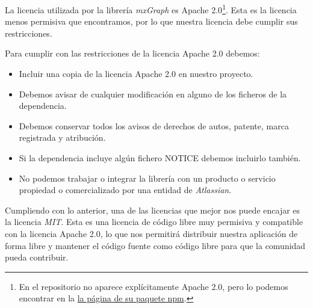 La licencia utilizada por la librería \textit{mxGraph} es Apache 2.0\footnote{En el repositorio no aparece explícitamente Apache 2.0, pero lo podemos encontrar en la \href{https://www.npmjs.com/package/mxgraph}{la página de su paquete npm}.}. Esta es la licencia menos permisiva que encontramos, por lo que nuestra licencia debe cumplir sus restricciones.

Para cumplir con las restricciones de la licencia Apache 2.0 debemos:
\begin{itemize}
    \item Incluir una copia de la licencia Apache 2.0 en nuestro proyecto.
    \item Debemos avisar de cualquier modificación en alguno de los ficheros de la dependencia.
    \item Debemos conservar todos los avisos de derechos de autos, patente, marca registrada y atribución.
    \item Si la dependencia incluye algún fichero NOTICE debemos incluirlo también.
    \item No podemos trabajar o integrar la librería con un producto o servicio propiedad o comercializado por una entidad de \textit{Atlassian}.
\end{itemize}

Cumpliendo con lo anterior, una de las licencias que mejor nos puede encajar es la licencia \emph{MIT}. Esta es una licencia de código libre muy permisiva y compatible con la licencia Apache 2.0, lo que nos permitirá distribuir nuestra aplicación de forma libre y mantener el código fuente como código libre para que la comunidad pueda contribuir.